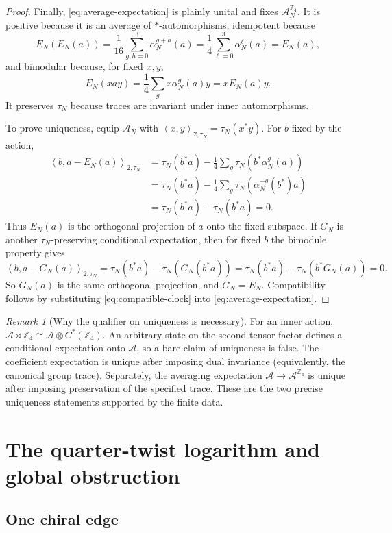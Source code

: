 \documentclass[11pt]{article}
\theoremstyle{remark}
\newtheorem{remark}[theorem]{Remark}
\newcommand{\A}{\mathcal A}
\newcommand{\ip}[2]{\left\langle #1,#2\right\rangle}
\begin{document}
\begin{proof}
Finally, \eqref{eq:average-expectation} is plainly unital and fixes
$\A_N^{\mathbb Z_4}$.  It is positive because it is an average of
$*$-automorphisms, idempotent because
\[
 E_N(E_N(a))
 =\frac1{16}\sum_{g,h=0}^3\alpha_N^{g+h}(a)
 =\frac14\sum_{\ell=0}^3\alpha_N^\ell(a)=E_N(a),
\]
and bimodular because, for fixed $x,y$,
\[
 E_N(xay)=\frac14\sum_gx\alpha_N^g(a)y=xE_N(a)y.
\]
It preserves $\tau_N$ because traces are invariant under inner
automorphisms.

To prove uniqueness, equip $\A_N$ with
$\ip{x}{y}_{2,\tau_N}=\tau_N(x^*y)$.  For $b$ fixed by the action,
\[
\begin{aligned}
\ip{b}{a-E_N(a)}_{2,\tau_N}
&=\tau_N(b^*a)
 -\frac14\sum_g\tau_N(b^*\alpha_N^g(a))\\
&=\tau_N(b^*a)
 -\frac14\sum_g\tau_N(\alpha_N^{-g}(b^*)a)\\
&=\tau_N(b^*a)-\tau_N(b^*a)=0.
\end{aligned}
\]
Thus $E_N(a)$ is the orthogonal projection of $a$ onto the fixed
subspace.  If $G_N$ is another $\tau_N$-preserving conditional
expectation, then for fixed $b$ the bimodule property gives
\[
\ip{b}{a-G_N(a)}_{2,\tau_N}
=\tau_N(b^*a)-\tau_N(G_N(b^*a))
=\tau_N(b^*a)-\tau_N(b^*G_N(a))=0.
\]
So $G_N(a)$ is the same orthogonal projection, and $G_N=E_N$.
Compatibility follows by substituting
\eqref{eq:compatible-clock} into \eqref{eq:average-expectation}.
\end{proof}

\begin{remark}[Why the qualifier on uniqueness is necessary]
For an inner action,
$\A\rtimes\mathbb Z_4\cong\A\otimes C^*(\mathbb Z_4)$.
An arbitrary state on the second tensor factor defines a conditional
expectation onto $\A$, so a bare claim of uniqueness is false.
The coefficient expectation is unique after imposing dual invariance
(equivalently, the canonical group trace).  Separately, the averaging
expectation $\A\to\A^{\mathbb Z_4}$ is unique after imposing preservation
of the specified trace.  These are the two precise uniqueness statements
supported by the finite data.
\end{remark}

\section{The quarter-twist logarithm and global obstruction}
\label{sec:global}

\subsection{One chiral edge}
\end{document}
